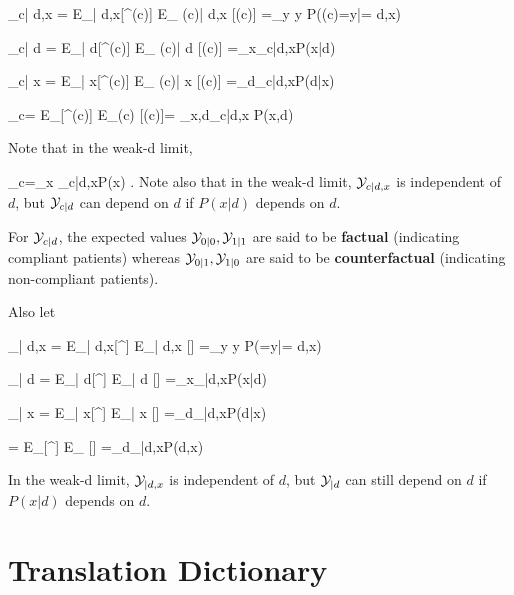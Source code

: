 \beq
\caly_{c| d,x}
=
E_{\s| d,x}[\rvy^\s(c)]
\rarrow
E_{ \rvy(c)| d,x} [\rvy(c)]
=\sum_{y} y
P(\rvy(c)=y|\rvd= d,x)
\label{eq-need-positivity}
\eeq

\beq
\caly_{c| d}
=
E_{\s| d}[\rvy^\s(c)]
\rarrow
E_{ \rvy(c)| d} [\rvy(c)]
=\sum_x\caly_{c|d,x}P(x|d)
\eeq

\beq
\caly_{c| x}
=
E_{\s| x}[\rvy^\s(c)]
\rarrow
E_{ \rvy(c)| x} [\rvy(c)]
=\sum_d\caly_{c|d,x}P(d|x)
\eeq


\beq
\caly_c=
E_{\s}[\rvy^\s(c)]
\rarrow
E_{\rvy(c)} [\rvy(c)]=
\sum_{x,d}\caly_{c|d,x} P(x,d)
\eeq

Note that in the weak-d limit,


\beq
\caly_c=\sum_x \caly_{c|d,x}P(x)
\;.
\eeq
Note also that in the weak-d limit,
${\cal Y}_{c|d, x}$ is independent
of $d$,
but ${\cal Y}_{c|d}$
can depend on $d$
if $P(x|d)$ depends on $d$.


For ${\cal Y}_{c|d}$, the expected values ${\cal Y}_{0|0}, {\cal Y}_{1|1}$
are said to be {\bf factual}
(indicating compliant patients)
whereas
${\cal Y}_{0|1}, {\cal Y}_{1|0}$
are said to be {\bf counterfactual}
(indicating non-compliant patients).

Also let

\beq
\caly_{| d,x}
=
E_{\s| d,x}[\rvy^\s]
\rarrow
E_{\rvy| d,x} [\rvy]
=\sum_{y} y
P(\rvy=y|\rvd= d,x)
\eeq


\beq
\caly_{| d}
=
E_{\s| d}[\rvy^\s]
\rarrow
E_{\rvy| d} [\rvy]
=\sum_x\caly_{|d,x}P(x|d)
\eeq

\beq
\caly_{| x}
=
E_{\s| x}[\rvy^\s]
\rarrow
E_{\rvy| x} [\rvy]
=\sum_d\caly_{|d,x}P(d|x)
\eeq

\beq
\caly
=
E_{\s}[\rvy^\s]
\rarrow
E_{\rvy} [\rvy]
=\sum_d\caly_{|d,x}P(d,x)
\eeq


In the weak-d limit,
${\cal Y}_{|d,x}$ is independent
of $d$, but
${\cal Y}_{|d}$ can still depend on  $d$
if $P(x|d)$ depends on $d$.




\section{Translation Dictionary}

